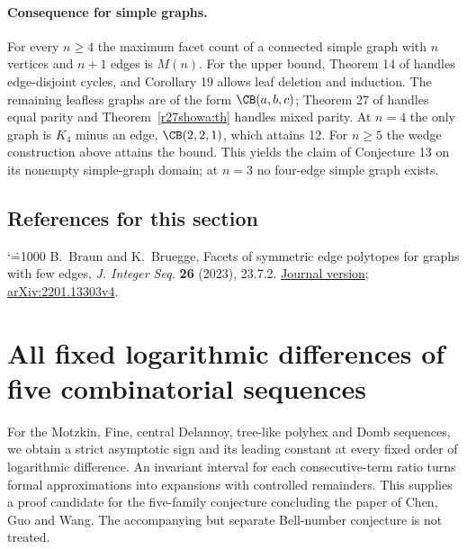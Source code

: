 \documentclass[11pt,a4paper]{article}
\makeatletter
\numberwithin{equation}{section}
\theoremstyle{definition}
\theoremstyle{remark}
\newenvironment{sectionabstract}{\par\smallskip\begingroup\small\noindent}{\par\endgroup\medskip}
\renewenvironment{thebibliography}[1]
 {\subsection*{References for this section}\small
  \list{\@biblabel{\@arabic\c@enumiv}}
       {\settowidth\labelwidth{\@biblabel{#1}}\leftmargin\labelwidth
        \advance\leftmargin\labelsep\@openbib@code
        \usecounter{enumiv}\let\p@enumiv\@empty
        \renewcommand\theenumiv{\@arabic\c@enumiv}}
  \sloppy\clubpenalty4000\widowpenalty4000\sfcode`\.=1000\relax}
 {\def\@noitemerr{\@latex@warning{Empty bibliography}}\endlist}
\makeatother
\begin{document}
\paragraph{Consequence for simple graphs.}
For every $n\ge4$ the maximum facet count of a connected simple graph with
$n$ vertices and $n+1$ edges is $M(n)$. For the upper bound, Theorem 14
of \cite{r27showa:BB} handles edge-disjoint cycles, and Corollary 19 allows leaf
deletion and induction. The remaining leafless graphs are of the form
$\CB(a,b,c)$; Theorem 27 of \cite{r27showa:BB} handles equal parity and
Theorem~\ref{r27showa:th} handles mixed parity. At $n=4$ the only graph is
$K_4$ minus an edge, $\CB(2,2,1)$, which attains 12. For $n\ge5$ the
wedge construction above attains the bound. This yields the claim of
Conjecture 13 on its nonempty simple-graph domain; at $n=3$ no
four-edge simple graph exists.
\begin{thebibliography}{1}\small
{} B.~Braun and K.~Bruegge, Facets of symmetric edge polytopes
for graphs with few edges, \emph{J. Integer Seq.} \textbf{26} (2023),
23.7.2. \href{https://cs.uwaterloo.ca/journals/JIS/VOL26/Braun/braun6.pdf}{Journal version};
\href{https://arxiv.org/html/2201.13303v4}{arXiv:2201.13303v4}.
\end{thebibliography}

\par\endgroup

\begingroup

\section{\texorpdfstring{All fixed logarithmic differences of five combinatorial sequences}{All fixed logarithmic differences of five combinatorial sequences}}\label{section:r27reiwa}
\par\medskip


\begin{sectionabstract}
For the Motzkin, Fine, central Delannoy, tree-like polyhex and Domb sequences, we obtain a strict asymptotic sign and its leading constant at every fixed order of logarithmic difference. An invariant interval for each consecutive-term ratio turns formal approximations into expansions with controlled remainders. This supplies a proof candidate for the five-family conjecture concluding the paper of Chen, Guo and Wang. The accompanying but separate Bell-number conjecture is not treated.
\end{sectionabstract}
\end{document}
